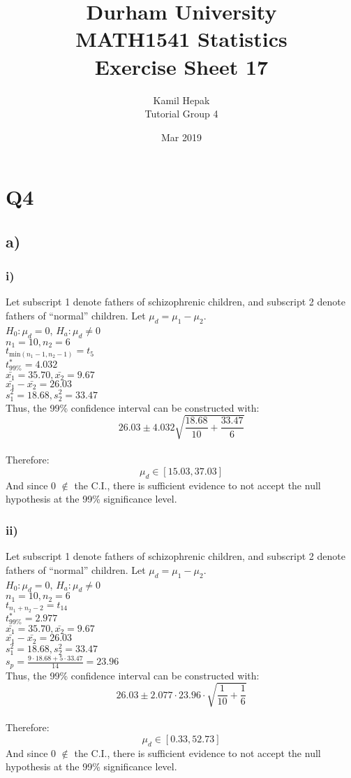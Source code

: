 \documentclass[]{article}
\title{\vspace{-3cm}Durham University\\
    MATH1541 Statistics \\
	Exercise Sheet 17}
\author{Kamil Hepak\\
        Tutorial Group 4}
\date{Mar 2019}
\begin{document}
\maketitle

\section{Q4}
\subsection{a)}
\subsubsection{i)}
Let subscript 1 denote fathers of schizophrenic children, and subscript 2 denote fathers of ``normal'' children. Let $\mu_d = \mu_1 - \mu_2$.
\\
$H_0: \mu_d = 0$, $H_a: \mu_d \neq 0$
\\
$n_1 = 10, n_2 = 6$
\\
$t_{\textrm{min}(n_1-1, n_2-1)} = t_5$
\\
$t^*_{99\%} = 4.032$
\\
$\bar{x_1} = 35.70, \bar{x_2} = 9.67$
\\
$\bar{x_1} - \bar{x_2} = 26.03$
\\
$s^2_1 = 18.68, s^2_2 = 33.47$
\\
Thus, the 99\% confidence interval can be constructed with:
$$26.03 \pm 4.032 \sqrt{\frac{18.68}{10}+\frac{33.47}{6}}$$
\\
Therefore:
$$\mu_d \in [15.03,37.03]$$
And since 0 $\notin$ the C.I., there is sufficient evidence to not accept the null hypothesis at the 99\% significance level.

\subsubsection{ii)}
Let subscript 1 denote fathers of schizophrenic children, and subscript 2 denote fathers of ``normal'' children. Let $\mu_d = \mu_1 - \mu_2$.
\\
$H_0: \mu_d = 0$, $H_a: \mu_d \neq 0$
\\
$n_1 = 10, n_2 = 6$
\\
$t_{n_1+n_2-2} = t_{14}$
\\
$t^*_{99\%} = 2.977$
\\
$\bar{x_1} = 35.70, \bar{x_2} = 9.67$
\\
$\bar{x_1} - \bar{x_2} = 26.03$
\\
$s^2_1 = 18.68, s^2_2 = 33.47$
\\
$s_p = \frac{9\cdot 18.68 + 5\cdot 33.47}{14} = 23.96$
\\
Thus, the 99\% confidence interval can be constructed with:
$$26.03 \pm 2.077 \cdot 23.96 \cdot \sqrt{\frac{1}{10}+\frac{1}{6}}$$
\\
Therefore:
$$\mu_d \in [0.33,52.73]$$
And since 0 $\notin$ the C.I., there is sufficient evidence to not accept the null hypothesis at the 99\% significance level.
\end{document}
